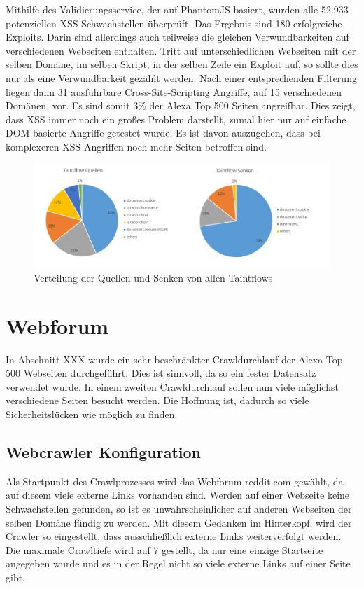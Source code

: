 Mithilfe des Validierungsservice, der auf PhantomJS basiert, wurden alle 52.933 potenziellen XSS Schwachstellen überprüft. Das Ergebnis sind 180 erfolgreiche Exploits. Darin sind allerdings auch teilweise die gleichen Verwundbarkeiten auf verschiedenen Webseiten enthalten. Tritt auf unterschiedlichen Webseiten mit der selben Domäne, im selben Skript, in der selben Zeile ein Exploit auf, so sollte dies nur als eine Verwundbarkeit gezählt werden. Nach einer entsprechenden Filterung liegen dann 31 ausführbare Cross-Site-Scripting Angriffe, auf 15 verschiedenen Domänen, vor. Es sind somit 3\% der Alexa Top 500 Seiten angreifbar. Dies zeigt, dass XSS immer noch ein großes Problem darstellt, zumal hier nur auf einfache DOM basierte Angriffe getestet wurde. Es ist davon auszugehen, dass bei komplexeren XSS Angriffen noch mehr Seiten betroffen sind.
 

\begin{figure}
	\centering
	\includegraphics[width=1\textwidth]{Bilder/Diagram1.png}
	\caption{Verteilung der Quellen und Senken von allen Taintflows}
\end{figure}

\section{Webforum}
In Abschnitt XXX wurde ein sehr beschränkter Crawldurchlauf der Alexa Top 500 Webseiten durchgeführt. Dies ist sinnvoll, da so ein fester Datensatz verwendet wurde. In einem zweiten Crawldurchlauf sollen nun viele möglichst verschiedene Seiten besucht werden. Die Hoffnung ist, dadurch so viele Sicherheitslücken wie möglich zu finden.
\subsection{Webcrawler Konfiguration}
Als Startpunkt des Crawlprozesses wird das Webforum reddit.com gewählt, da auf diesem viele externe Links vorhanden sind. Werden auf einer Webseite keine Schwachstellen gefunden, so ist es unwahrscheinlicher auf anderen Webseiten der selben Domäne fündig zu werden. Mit diesem Gedanken im Hinterkopf, wird der Crawler so eingestellt, dass ausschließlich externe Links weiterverfolgt werden. \\
Die maximale Crawltiefe wird auf 7 gestellt, da nur eine einzige Startseite angegeben wurde und es in der Regel nicht so viele externe Links auf einer Seite gibt.
